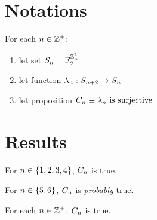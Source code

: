 \documentclass{paper}
\begin{document}

\begin{center}
\Large{\mytitle}
\end{center}

\tableofcontents

\begin{flushleft}


\section{Notations}

For each $n \in \mathbb{Z}^+$:
\begin{enumerate}
\item let set $S_{n} = \mathbb{F}_2 ^ {\mathbb{Z}_n ^ 2}$
\item let function $\lambda_{n}: S_{n+2} \to S_{n}$
\item let proposition $C_{n} \equiv \lambda_{n}
  \text{ is surjective}$
\end{enumerate}


\section{Results}

\begin{remark}
For $n \in \{1, 2, 3, 4\}$, $C_{n}$ is true.
\end{remark}

\begin{remark}
For $n \in \{5, 6\}$, $C_{n}$ is \emph{probably} true.
\end{remark}

\begin{conjecture}
For each $n \in \mathbb{Z}^+$, $C_{n}$ is true.
\end{conjecture}


\end{flushleft}
\end{document}

